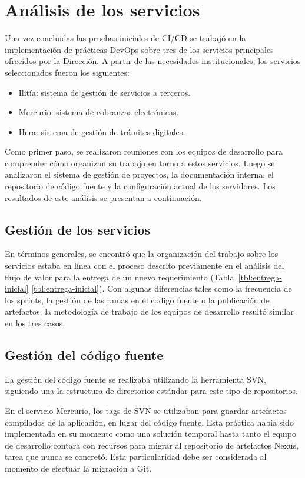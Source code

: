 \section{Análisis de los servicios}
%
Una vez concluidas las pruebas iniciales de CI/CD se trabajó en la
implementación de prácticas DevOps sobre tres de los servicios
principales ofrecidos por la Dirección. A partir de las necesidades
institucionales, los servicios seleccionados fueron los siguientes:
%
\begin{itemize}
\item Ilitía: sistema de gestión de servicios a terceros.
\item Mercurio: sistema de cobranzas electrónicas.
\item Hera: sistema de gestión de trámites digitales.
\end{itemize}
%
Como primer paso, se realizaron reuniones con los equipos de
desarrollo para comprender cómo organizan su trabajo en torno a estos
servicios. Luego se analizaron el sistema de gestión de proyectos, la
documentación interna, el repositorio de código fuente y la
configuración actual de los servidores. Los resultados de este
análisis se presentan a continuación.
%
\subsection{Gestión de los servicios}
%
En términos generales, se encontró que la organización del trabajo
sobre los servicios estaba en línea con el proceso descrito
previamente en el análisis del flujo de valor para la entrega de un
nuevo requerimiento (\iflatexml{}Tabla~\ref{tbl:entrega-inicial}\else%
\autoref{tbl:entrega-inicial}\fi). Con algunas diferencias tales como
la frecuencia de los sprints, la gestión de las ramas en el código
fuente o la publicación de artefactos, la metodología de trabajo de
los equipos de desarrollo resultó similar en los tres casos.
%
\subsection{Gestión del código fuente}
%
La gestión del código fuente se realizaba utilizando la herramienta
SVN, siguiendo una la estructura de directorios
 estándar para este tipo de repositorios.

En el servicio Mercurio, los tags de SVN se utilizaban para guardar
artefactos compilados de la aplicación, en lugar del código
fuente. Esta práctica había sido implementada en su momento como una
solución temporal hasta tanto el equipo de desarrollo contara con
recursos para migrar al repositorio de artefactos Nexus, tarea que
nunca se concretó. Esta particularidad debe ser considerada al momento
de efectuar la migración a Git.
%
